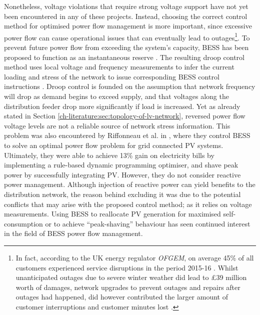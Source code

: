 Nonetheless, voltage violations that require strong voltage support have not yet been encountered in any of these projects.
Instead, choosing the correct control method for optimised power flow management is more important, since excessive power flow can cause operational issues that can eventually lead to outages\footnote{%
In fact, according to the UK energy regulator \textit{OFGEM}, on average 45\% of all customers experienced service disruptions in the period 2015-16 \cite{Ofgem2017}.
Whilst unanticipated outages due to severe winter weather did lead to \pounds39 million worth of damages, network upgrades to prevent outages and repairs after outages had happened, did however contributed the larger amount of customer interruptions and customer minutes lost \cite{Ofgem2014}.%
}.
To prevent future power flow from exceeding the system's capacity, BESS has been proposed to function as an instantaneous reserve \cite{Kunisch1986a, Kunisch1986}.
The resulting droop control method uses local voltage and frequency measurements to infer the current loading and stress of the network to issue corresponding BESS control instructions \cite{Engler2005a}.
Droop control is founded on the assumption that network frequency will drop as demand begins to exceed supply, and that voltages along the distribution feeder drop more significantly if load is increased.
Yet as already stated in Section \ref{ch-literature:sec:topology-of-lv-network}, reversed power flow voltage levels are not a reliable source of network stress information.
This problem was also encountered by Riffonneau et al. in \cite{Riffonneau2011}, where they control BESS to solve an optimal power flow problem for grid connected PV systems.
Ultimately, they were able to achieve 13\% gain on electricity bills by implementing a rule-based dynamic programming optimiser, and shave peak power by successfully integrating PV.
However, they do not consider reactive power management.
Although injection of reactive power can yield benefits to the distribution network, the reason behind excluding it was due to the potential conflicts that may arise with the proposed control method; as it relies on voltage measurements.
Using BESS to reallocate PV generation for maximised self-consumption \cite{SaniHassan2017} or to achieve ``peak-shaving'' behaviour \cite{Bennett2015a, DePaola2016} has seen continued interest in the field of BESS power flow management.

